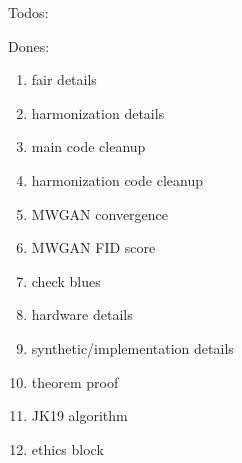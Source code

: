 Todos:
\begin{enumerate}
\end{enumerate}

Dones:
\begin{enumerate}
    \item fair details
    \item harmonization details
    \item main code cleanup
    \item harmonization code cleanup
    \item MWGAN convergence
    \item MWGAN FID score
    \item check blues
    \item hardware details
    \item synthetic/implementation details
    \item theorem proof
    \item JK19 algorithm
    \item ethics block
\end{enumerate}